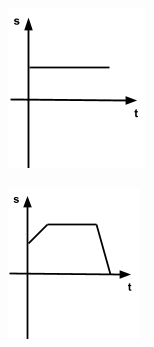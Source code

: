 \documentclass{report} \usepackage[T1]{fontenc} \usepackage[italian]{babel}
\begin{document}
\begin{enumerate}
\begin{figure}[H]
\centering
  \begin{subfigure}[b]{0.3\textwidth}
  \includegraphics[width=\textwidth]{test_images/image1}
  \end{subfigure}
  \begin{subfigure}[b]{0.3\textwidth}
  \includegraphics[width=\textwidth]{test_images/image2}

\end{subfigure}
\end{figure}
\end{enumerate}
\end{document}
